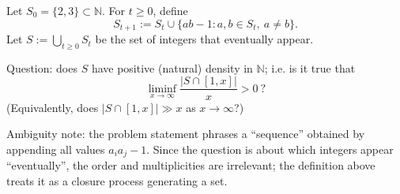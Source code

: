 Let $S_0=\{2,3\}\subset\mathbb N$. For $t\ge 0$, define
\[
 S_{t+1}:=S_t\cup\{ab-1: a,b\in S_t,\ a\ne b\}.
\]
Let $S:=\bigcup_{t\ge 0}S_t$ be the set of integers that eventually appear.

Question: does $S$ have positive (natural) density in $\mathbb N$; i.e. is it true that
\[
 \liminf_{x\to\infty}\frac{|S\cap[1,x]|}{x}>0\ ?
\]
(Equivalently, does $|S\cap[1,x]|\gg x$ as $x\to\infty$?)

Ambiguity note: the problem statement phrases a “sequence” obtained by appending all values $a_ia_j-1$. Since the question is about which integers appear “eventually”, the order and multiplicities are irrelevant; the definition above treats it as a closure process generating a set.
